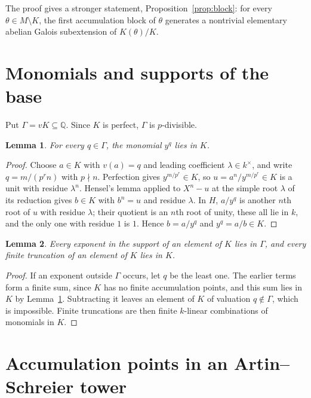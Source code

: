 \documentclass[11pt]{article}
\newtheorem{lemma}{Lemma}[section]
\newcommand{\Q}{\mathbb Q}
\begin{document}
The proof gives a stronger statement, Proposition~\ref{prop:block}: for every $\theta\in M\setminus K$, the first accumulation block of $\theta$ generates a nontrivial elementary abelian Galois subextension of $K(\theta)/K$.

\section{Monomials and supports of the base}\label{sec:base}

Put $\Gamma=vK\subseteq\Q$. Since $K$ is perfect, $\Gamma$ is $p$-divisible.

\begin{lemma}\label{lem:monomial}
For every $q\in\Gamma$, the monomial $y^q$ lies in $K$.
\end{lemma}

\begin{proof}
Choose $a\in K$ with $v(a)=q$ and leading coefficient $\lambda\in k^\times$, and write $q=m/(p^rn)$ with $p\nmid n$. Perfection gives $y^{m/p^r}\in K$, so $u=a^n/y^{m/p^r}\in K$ is a unit with residue $\lambda^n$. Hensel's lemma applied to $X^n-u$ at the simple root $\lambda$ of its reduction gives $b\in K$ with $b^n=u$ and residue $\lambda$. In $H$, $a/y^q$ is another $n$th root of $u$ with residue $\lambda$; their quotient is an $n$th root of unity, these all lie in $k$, and the only one with residue $1$ is $1$. Hence $b=a/y^q$ and $y^q=a/b\in K$.
\end{proof}

\begin{lemma}\label{lem:basesupport}
Every exponent in the support of an element of $K$ lies in $\Gamma$, and every finite truncation of an element of $K$ lies in $K$.
\end{lemma}

\begin{proof}
If an exponent outside $\Gamma$ occurs, let $q$ be the least one. The earlier terms form a finite sum, since $K$ has no finite accumulation points, and this sum lies in $K$ by Lemma~\ref{lem:monomial}. Subtracting it leaves an element of $K$ of valuation $q\notin\Gamma$, which is impossible. Finite truncations are then finite $k$-linear combinations of monomials in $K$.
\end{proof}

\section{Accumulation points in an Artin--Schreier tower}\label{sec:support}
\end{document}
